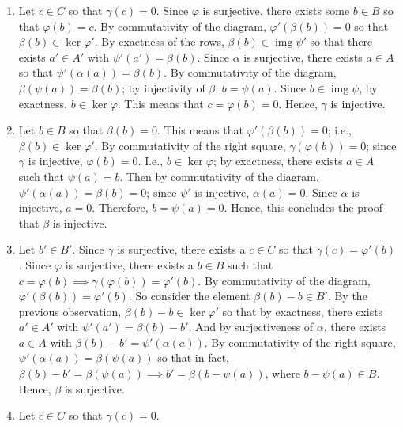 \documentclass{article}
\begin{document}
	\begin{enumerate}[itemsep =-2pt,label = (\alph{*})]
		\item Let $c \in C$ so that $\gamma(c) = 0$. Since $\varphi$ is surjective, there exists some $b \in B$ so that $\varphi(b) = c$. By commutativity of the diagram, $\varphi'(\beta(b)) = 0$ so that $\beta(b) \in \ker{\varphi'}$. By exactness of the rows, $\beta(b) \in \operatorname{img}{\psi'}$ so that there exists $a' \in A'$ with $\psi'(a') = \beta(b)$. Since $\alpha$ is surjective, there exists $a \in A$ so that $\psi'(\alpha(a)) = \beta(b)$. By commutativity of the diagram, $\beta(\psi(a)) =\beta(b)$; by injectivity of $\beta$, $b = \psi(a)$. Since $b \in \operatorname{img}{\psi}$, by exactness, $b \in \ker{\varphi}$. This means that $c = \varphi(b) =0$. Hence, $\gamma$ is injective. 
		\item Let $b \in B$ so that $\beta(b) =0$. This means that $\varphi'(\beta(b)) = 0$; i.e., $\beta(b) \in \ker{\varphi'}$. By commutativity of the right square, $\gamma(\varphi(b)) = 0$; since $\gamma$ is injective, $\varphi(b) = 0$. I.e., $b \in \ker{\varphi}$; by exactness, there exists $a \in A$ such that $\psi(a) = b$. Then by commutativity of the diagram, $\psi'(\alpha(a)) = \beta(b) =0$; since $\psi'$ is injective, $\alpha(a) =0$. Since $\alpha$ is injective, $a = 0$. Therefore, $b = \psi(a) = 0$. Hence, this concludes the proof that $\beta$ is injective. 
		\item Let $b' \in B'$. Since $\gamma$ is surjective, there exists a $c \in C$ so that $\gamma(c) = \varphi'(b)$. Since $\varphi$ is surjective, there exists a $b \in B$ such that $c = \varphi(b) \implies \gamma(\varphi(b)) = \varphi'(b)$. By commutativity of the diagram, $\varphi'(\beta(b)) = \varphi'(b)$. So consider the element $\beta(b) - b \in B'$. By the previous observation, $\beta(b) - b \in \ker{\varphi'}$ so that by exactness, there exists $a' \in A'$ with $\psi'(a') = \beta(b) - b'$. And by surjectiveness of $\alpha$, there exists $a \in A$ with $\beta(b) - b' = \psi'(\alpha(a))$. By commutativity of the right square, $\psi'(\alpha(a)) = \beta(\psi(a))$ so that in fact, $\beta(b) - b' = \beta(\psi(a)) \implies b' =\beta(b - \psi(a))$, where $b - \psi(a) \in B$. Hence, $\beta$ is surjective.
		\item Let $c \in C$ so that $\gamma(c) = 0$. 
	\end{enumerate}
	
\end{document}
